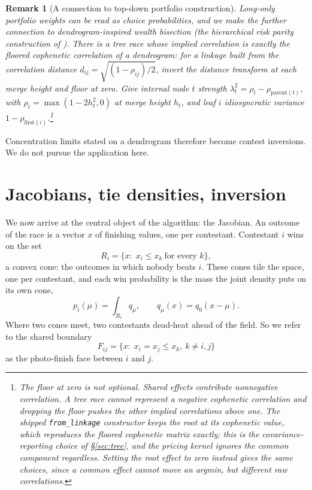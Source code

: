\documentclass[11pt]{article}
\newtheorem{remark}{Remark}
\begin{document}
\begin{remark}[A connection to top-down portfolio construction]\label{rem:hrp}
Long-only portfolio weights can be read as choice probabilities, and we make the further connection to dendrogram-inspired wealth bisection (the hierarchical risk parity construction of \citet{lopezdeprado2016}).
There is a tree race whose implied correlation is exactly the
\emph{floored} cophenetic correlation of a dendrogram: for a linkage
built from the correlation distance $d_{ij}=\sqrt{(1-\rho_{ij})/2}$,
invert the distance transform at each merge height and floor at zero. Give internal node $t$ strength
$\lambda_t^2=\rho_t-\rho_{\mathrm{parent}(t)}$, with
$\rho_t=\max(1-2h_t^2,0)$ at merge height $h_t$, and leaf $i$
idiosyncratic variance $1-\rho_{\mathrm{first}(i)}$.\footnote{The floor at zero is not optional. Shared effects contribute nonnegative
correlation. A tree race cannot represent a negative cophenetic
correlation and dropping the floor pushes the other implied correlations
above one. The shipped \texttt{from\_linkage} constructor keeps the root at its
cophenetic value, which reproduces the floored cophenetic matrix exactly;
this is the covariance-reporting choice of \S\ref{sec:tree}, and the
pricing kernel ignores the common component regardless. Setting the root
effect to zero instead gives the same choices, since a common effect
cannot move an argmin, but different raw correlations.}
\end{remark}

Concentration limits stated on a dendrogram therefore become contest
inversions. We do not pursue the application here.

\section{Jacobians, tie densities, inversion}\label{sec:jac}

We now arrive at the central object of the algorithm: the Jacobian. An outcome of the race is a vector $x$ of finishing values, one per
contestant. Contestant $i$ wins on the set
\[
  R_i=\{x:\;x_i\le x_k\ \text{for every }k\},
\]
a convex cone: the outcomes in which nobody beats $i$. These cones tile
the space, one per contestant, and each win probability is the mass the
joint density puts on its own cone,
\[
  p_i(\mu)=\int_{R_i}q_\mu,\qquad q_\mu(x)=q_0(x-\mu).
\]
Where two cones meet, two contestants dead-heat ahead of the field. So we refer to the
shared boundary
\[
  F_{ij}=\{x:\;x_i=x_j\le x_k,\ k\ne i,j\}
\]
as the photo-finish face between $i$ and $j$.
\end{document}
